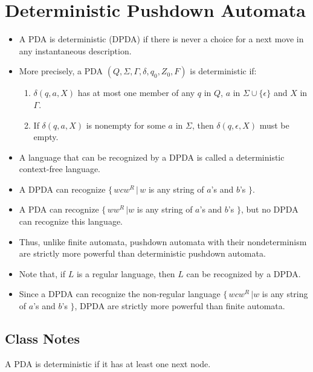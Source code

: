 \documentclass[]{article}
\begin{document}
\section{Deterministic Pushdown Automata}
  \begin{itemize}
    \item A PDA is deterministic (DPDA) if there is never a choice for a next 
    move in any instantaneous description.
    \item More precisely, a PDA $(Q,\Sigma,\Gamma,\delta,q_0,Z_0,F)$ is 
    deterministic if:
      \begin{enumerate}
        \item $\delta(q,a,X)$ has at most one member of any $q$ in $Q$, $a$ in 
        $\Sigma \cup \{\epsilon\}$ and $X$ in $\Gamma$.
        \item If $\delta(q,a,X)$ is nonempty for some $a$ in $\Sigma$, then 
        $\delta(q,\epsilon,X)$ must be empty.
      \end{enumerate}
    \item A language that can be recognized by a DPDA is called a deterministic 
    context-free language.
    \item A DPDA can recognize $\{ \, wcw^R \, | \, w$ is any string of $a$'s 
    and $b$'s $\}$.
    \item A PDA can recognize $\{ \, ww^R \, | w$ is any string of $a$'s and $b
    $'s $\}$, but no DPDA can recognize this language.
    \item Thus, unlike finite automata, pushdown automata with their 
    nondeterminism are strictly more powerful than deterministic pushdown 
    automata.
    \item Note that, if $L$ is a regular language, then $L$ can be recognized by 
    a DPDA.
    \item Since a DPDA can recognize the non-regular language $\{ \, wcw^R \, | 
    w$ is any string of $a$'s and $b$'s $\}$, DPDA are strictly more powerful 
    than finite automata.
  \end{itemize}
  \subsection*{Class Notes}
    A PDA is deterministic if it has at least one next node.
\end{document}
